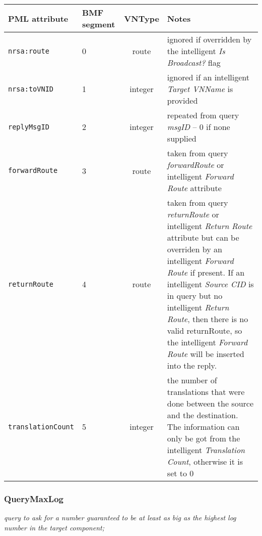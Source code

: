 \documentclass[pdftex,a4paper]{article}
\newcommand{\XMLfont}[1]{{\tt \small #1}}
\begin{document}
\begin{table}[!h]
  \begin{center}
    \label{tab:ReplyRoute}
    \begin{tabular}{|l|p{13mm}|c|p{60mm}|}
      \hline

      \textbf{PML attribute} & \textbf{BMF segment} & \textbf{VNType}
      & \textbf{Notes} \\\hline

      \XMLfont{nrsa:route} & 0 & route & ignored if overridden by the
      intelligent {\em Is Broadcast?} flag \\\hline

      \XMLfont{nrsa:toVNID} & 1 & integer & ignored if an intelligent
      {\em Target VNName} is provided \\\hline

      \XMLfont{replyMsgID} & 2 & integer & repeated from query
      {\em msgID} -- 0 if none supplied \\\hline

      \XMLfont{forwardRoute} & 3 & route & taken from query {\em
      forwardRoute} or intelligent {\em Forward Route} attribute
      \\\hline

      \XMLfont{returnRoute} & 4 & route & taken from query {\em
      returnRoute} or intelligent {\em Return Route} attribute
      but can be overriden by an intelligent {\em Forward Route} if
      present. If an intelligent {\em Source CID} is in query but no
      intelligent {\em Return Route}, then there is no valid
      returnRoute, so the intelligent {\em Forward Route} will be
      inserted into the reply.
      \\\hline

      \XMLfont{translationCount} & 5 & integer & the number of
      translations that were done between the source and the
      destination. The information can only be got from the
      intelligent {\em Translation Count}, otherwise it is
      set to 0 \\\hline
    \end{tabular}
  \end{center}
\end{table}

\clearpage

\subsubsection{QueryMaxLog}

{\em query to ask for a number guaranteed to be at least as big as the
  highest log number in the target component;}
\end{document}
